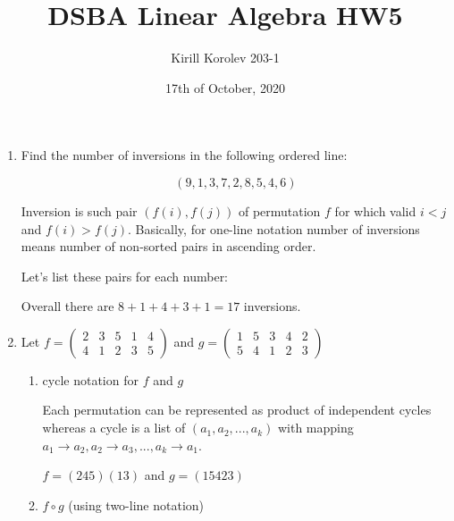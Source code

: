 \documentclass{article}
\title{DSBA Linear Algebra HW5}
\author{Kirill Korolev 203-1}
\date{17th of October, 2020}
\begin{document}
\maketitle

\begin{enumerate}

\item Find the number of inversions in the following ordered line:

\[(9,1,3,7,2,8,5,4,6)\]

Inversion is such pair $(f(i), f(j))$ of permutation $f$ for which valid $i < j$ and $f(i) > f(j)$. Basically, for one-line notation number of inversions means number of non-sorted pairs in ascending order.

Let's list these pairs for each number:


Overall there are $8 + 1 + 4 + 3 + 1 = 17$ inversions.

\item Let $f = \begin{pmatrix}2&3&5&1&4\\4&1&2&3&5\end{pmatrix}$ and $g = \begin{pmatrix}1&5&3&4&2\\5&4&1&2&3\end{pmatrix}$

\begin{enumerate}
\item cycle notation for $f$ and $g$

Each permutation can be represented as product of independent cycles whereas a cycle is a list of $(a_1, a_2, ..., a_k)$ with mapping $a_1 \to a_2, a_2 \to a_3, ..., a_k \to a_1$.

$f = (245)(13)$ and $g = (15423)$

\item $f \circ g$ (using two-line notation)


\end{enumerate}
\end{enumerate}
\end{document}
